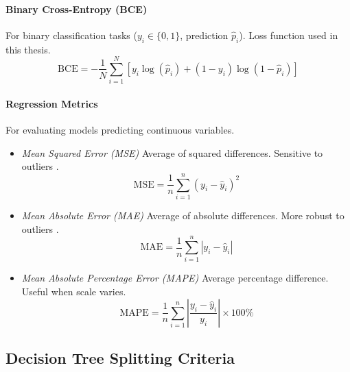\begin{appendices}
  \paragraph{Binary Cross-Entropy (BCE)}
  \label{eq:bce}
  For binary classification tasks ($y_i \in \{0, 1\}$, prediction $\hat{p}_i$). Loss function used in this thesis.
  \begin{equation}
    \text{BCE} = -\frac{1}{N} \sum_{i=1}^N [ y_i \log(\hat{p}_i) + (1 - y_i) \log(1 - \hat{p}_i) ]
  \end{equation}

  \paragraph{Regression Metrics}
  For evaluating models predicting continuous variables.
  \begin{itemize}
    \item \textit{Mean Squared Error (MSE)} Average of squared differences. Sensitive to outliers \autocite{fahrmeir2016statistik}.
          \begin{equation}
            \text{MSE} = \frac{1}{n} \sum_{i=1}^{n} (y_i - \hat{y}_i)^2
          \end{equation}
    \item \textit{Mean Absolute Error (MAE)} Average of absolute differences. More robust to outliers \autocite{fahrmeir2016statistik}.
          \begin{equation}
            \text{MAE} = \frac{1}{n} \sum_{i=1}^{n} |y_i - \hat{y}_i|
          \end{equation}
    \item \textit{Mean Absolute Percentage Error (MAPE)} Average percentage difference. Useful when scale varies.
          \begin{equation}
            \text{MAPE} = \frac{1}{n} \sum_{i=1}^{n} \left| \frac{y_i - \hat{y}_i}{y_i} \right| \times 100\%
          \end{equation}
  \end{itemize}


  \subsection{Decision Tree Splitting Criteria}
  \label{subsec:decision_tree_splitting_criteria}


\end{appendices}
